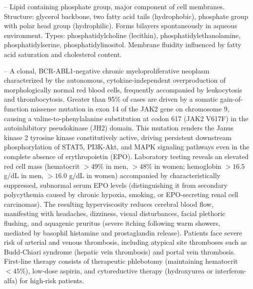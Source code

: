 -- Lipid containing phosphate group, major component of cell membranes. Structure: glycerol backbone, two fatty acid tails (hydrophobic), phosphate group with polar head group (hydrophilic). Forms bilayers spontaneously in aqueous environment. Types: phosphatidylcholine (lecithin), phosphatidylethanolamine, phosphatidylserine, phosphatidylinositol. Membrane fluidity influenced by fatty acid saturation and cholesterol content.

-- A clonal, BCR-ABL1-negative chronic myeloproliferative neoplasm characterized by the autonomous, cytokine-independent overproduction of morphologically normal red blood cells, frequently accompanied by leukocytosis and thrombocytosis. Greater than 95\% of cases are driven by a somatic gain-of-function missense mutation in exon 14 of the JAK2 gene on chromosome 9, causing a valine-to-phenylalanine substitution at codon 617 (JAK2 V617F) in the autoinhibitory pseudokinase (JH2) domain. This mutation renders the Janus kinase 2 tyrosine kinase constitutively active, driving persistent downstream phosphorylation of STAT5, PI3K-Akt, and MAPK signaling pathways even in the complete absence of erythropoietin (EPO). Laboratory testing reveals an elevated red cell mass (hematocrit $>49\%$ in men, $>48\%$ in women; hemoglobin $>16.5$ g/dL in men, $>16.0$ g/dL in women) accompanied by characteristically suppressed, subnormal serum EPO levels (distinguishing it from secondary polycythemia caused by chronic hypoxia, smoking, or EPO-secreting renal cell carcinomas). The resulting hyperviscosity reduces cerebral blood flow, manifesting with headaches, dizziness, visual disturbances, facial plethoric flushing, and aquagenic pruritus (severe itching following warm showers, mediated by basophil histamine and prostaglandin release). Patients face severe risk of arterial and venous thrombosis, including atypical site thromboses such as Budd-Chiari syndrome (hepatic vein thrombosis) and portal vein thrombosis. First-line therapy consists of therapeutic phlebotomy (maintaining hematocrit $<45\%$), low-dose aspirin, and cytoreductive therapy (hydroxyurea or interferon-alfa) for high-risk patients.

